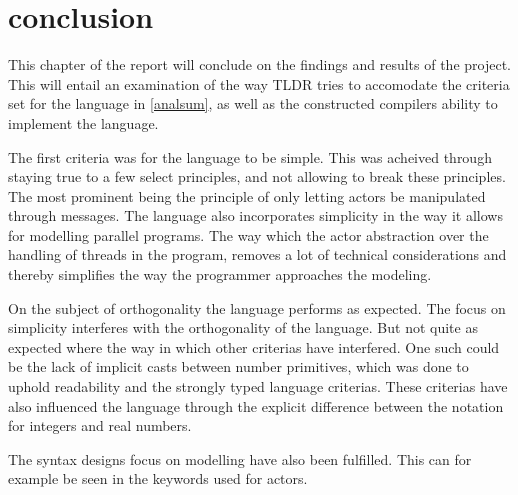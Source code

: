 \chapter{conclusion}

This chapter of the report will conclude on the findings and results of the project. This will entail an examination of the way TLDR tries to accomodate the criteria set for the language in \cref{analsum}, as well as the constructed compilers ability to implement the language.

The first criteria was for the language to be simple. This was acheived through staying true to a few select principles, and not allowing to break these principles. The most prominent being the principle of only letting actors be manipulated through messages. The language also incorporates simplicity in the way it allows for modelling parallel programs. The way which the actor abstraction over the handling of threads in the program, removes a lot of technical considerations and thereby simplifies the way the programmer approaches the modeling.
 
On the subject of orthogonality the language performs as expected. The focus on simplicity interferes with the orthogonality of the language. But not quite as expected where the way in which other criterias have interfered. One such could be the lack of implicit casts between number primitives, which was done to uphold readability and the strongly typed language criterias. These criterias have also influenced the language through the explicit difference between the notation for integers and real numbers.

The syntax designs focus on modelling have also been fulfilled. This can for example be seen in the keywords used for actors.







